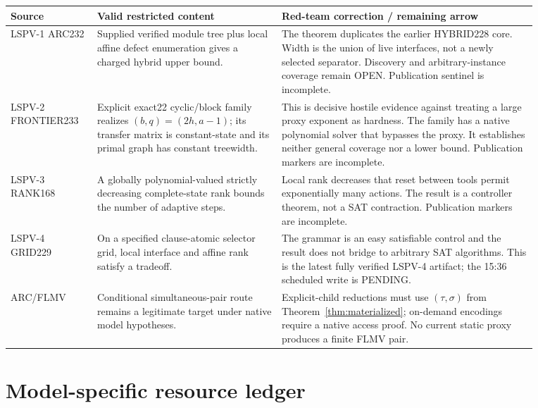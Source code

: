 \documentclass[11pt]{article}
\begin{document}
\begin{longtable}{p{0.13\linewidth}p{0.31\linewidth}p{0.43\linewidth}}
\toprule
Source & Valid restricted content & Red-team correction / remaining arrow\\
\midrule
LSPV-1 ARC232 & Supplied verified module tree plus local affine defect enumeration gives a charged
hybrid upper bound. & The theorem duplicates the earlier HYBRID228 core.  Width is the union of
live interfaces, not a newly selected separator.  Discovery and arbitrary-instance coverage remain
OPEN.  Publication sentinel is incomplete.\\
LSPV-2 FRONTIER233 & Explicit exact22 cyclic/block family realizes $(b,q)=(2h,a-1)$; its transfer
matrix is constant-state and its primal graph has constant treewidth. & This is decisive hostile
evidence against treating a large proxy exponent as hardness.  The family has a native polynomial
solver that bypasses the proxy.  It establishes neither general coverage nor a lower bound.
Publication markers are incomplete.\\
LSPV-3 RANK168 & A globally polynomial-valued strictly decreasing complete-state rank bounds the
number of adaptive steps. & Local rank decreases that reset between tools permit exponentially many
actions.  The result is a controller theorem, not a SAT contraction.  Publication markers are
incomplete.\\
LSPV-4 GRID229 & On a specified clause-atomic selector grid, local interface and affine rank satisfy a
tradeoff. & The grammar is an easy satisfiable control and the result does not bridge to arbitrary
SAT algorithms.  This is the latest fully verified LSPV-4 artifact; the 15:36 scheduled write is
PENDING.\\
ARC/FLMV & Conditional simultaneous-pair route remains a legitimate target under native model
hypotheses. & Explicit-child reductions must use $(\tau,\sigma)$ from
Theorem~\ref{thm:materialized}; on-demand encodings require a native access proof.  No current static
proxy produces a finite FLMV pair.\\
\bottomrule
\end{longtable}

\section{Model-specific resource ledger}
\end{document}
